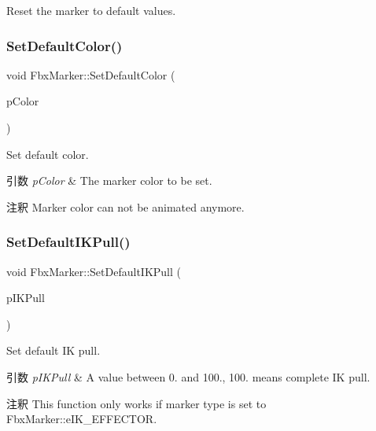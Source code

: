 Reset the marker to default values. 

\mbox{\label{class_fbx_marker_a2e9838e0facbae2d66e64fdbe28d01c0}} 
\subsubsection{\texorpdfstring{Set\+Default\+Color()}{SetDefaultColor()}}
{\footnotesize\ttfamily void Fbx\+Marker\+::\+Set\+Default\+Color (\begin{DoxyParamCaption}\item[{\hyperlink{class_fbx_color}{Fbx\+Color} \&}]{p\+Color }\end{DoxyParamCaption})}

Set default color. 
\begin{DoxyParams}{引数}
{\em p\+Color} & The marker color to be set. \\
\hline
\end{DoxyParams}
\begin{DoxyRemark}{注釈}
Marker color can not be animated anymore. 
\end{DoxyRemark}
\mbox{\label{class_fbx_marker_abe9b0c67c4b2eb8ec129a477302c9f39}} 
\subsubsection{\texorpdfstring{Set\+Default\+I\+K\+Pull()}{SetDefaultIKPull()}}
{\footnotesize\ttfamily void Fbx\+Marker\+::\+Set\+Default\+I\+K\+Pull (\begin{DoxyParamCaption}\item[{double}]{p\+I\+K\+Pull }\end{DoxyParamCaption})}

Set default IK pull. 
\begin{DoxyParams}{引数}
{\em p\+I\+K\+Pull} & A value between 0. and 100., 100. means complete IK pull. \\
\hline
\end{DoxyParams}
\begin{DoxyRemark}{注釈}
This function only works if marker type is set to Fbx\+Marker\+::e\+I\+K\+\_\+\+E\+F\+F\+E\+C\+T\+OR. 
\end{DoxyRemark}
\mbox{\label{class_fbx_marker_a21c9ece4ef7df5bdca3e92dd8bff2ddf}} 
